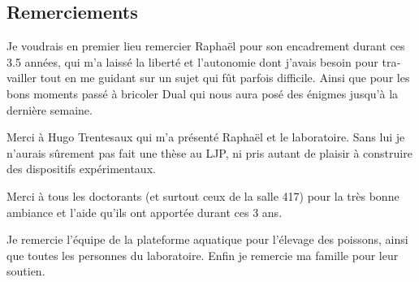 \begin{otherlanguage}{french}
\section*{Remerciements}
Je voudrais en premier lieu remercier Raphaël pour son encadrement durant ces 3.5 années, qui m'a laissé la liberté et l'autonomie dont j'avais besoin pour travailler tout en me guidant sur un sujet qui fût parfois difficile. Ainsi que pour les bons moments passé à bricoler Dual qui nous aura posé des énigmes jusqu'à la dernière semaine.

Merci à Hugo Trentesaux qui m'a présenté Raphaël et le laboratoire. Sans lui je n'aurais sûrement pas fait une thèse au LJP, ni pris autant de plaisir à construire des dispositifs expérimentaux.

Merci à tous les doctorants (et surtout ceux de la salle 417) pour la très bonne ambiance et l'aide qu'ils ont apportée durant ces 3 ans.

Je remercie l'équipe de la plateforme aquatique pour l'élevage des poissons, ainsi que toutes les personnes du laboratoire.
Enfin je remercie ma famille pour leur soutien.
\end{otherlanguage}
